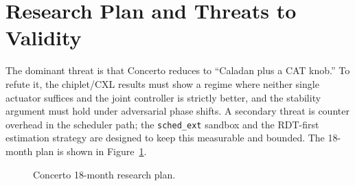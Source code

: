 \documentclass[sigconf,nonacm]{acmart}
\begin{document}
\section{Research Plan and Threats to Validity}
The dominant threat is that Concerto reduces to ``Caladan plus a CAT knob.'' To
refute it, the chiplet/CXL results must show a regime where neither single
actuator suffices and the joint controller is strictly better, and the stability
argument must hold under adversarial phase shifts. A secondary threat is counter
overhead in the scheduler path; the \texttt{sched\_ext} sandbox and the
RDT-first estimation strategy are designed to keep this measurable and bounded.
The 18-month plan is shown in Figure~\ref{fig:gantt}.

\begin{figure}[t]
\centering
{}
\caption{Concerto 18-month research plan.}
\label{fig:gantt}
\end{figure}

\nocite{snavely2000symbiotic,snavely2002priorities,bulpin2005hyperthreading,
tam2007clustering,knauerhase2008osobservations,suh2002memory,fedorova2007isolation,
banikazemi2008pam,zhuravlev2010contention,blagodurov2010contentionaware,
merkel2010resourceconscious,blagodurov2011numa}



\end{document}
